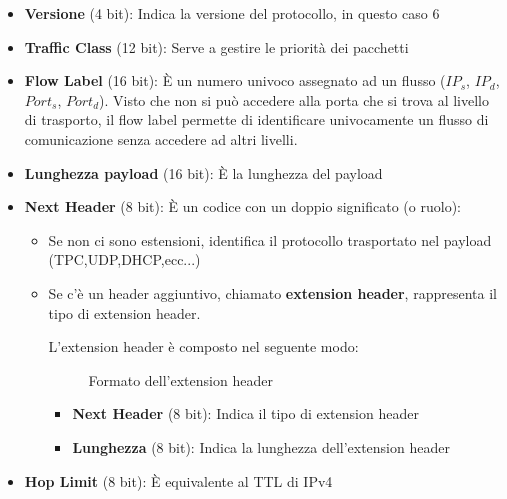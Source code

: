 \documentclass[a4paper]{article}
\begin{document}
\begin{itemize}
  \item \textbf{Versione} (4 bit): Indica la versione del protocollo, in questo caso 6
  \item \textbf{Traffic Class} (12 bit): Serve a gestire le priorità dei pacchetti
  \item \textbf{Flow Label} (16 bit): È un numero univoco assegnato ad un flusso 
    (\( IP_s \), \(IP_d\), \(Port_s\), \(Port_d \)). Visto che non si può accedere alla porta che si
    trova al livello di trasporto, il flow label permette di identificare univocamente
    un flusso di comunicazione senza accedere ad altri livelli.
  \item \textbf{Lunghezza payload} (16 bit): È la lunghezza del payload
  \item \textbf{Next Header} (8 bit): È un codice con un doppio significato (o ruolo):
    \begin{itemize}
      \item Se non ci sono estensioni, identifica il protocollo trasportato nel payload
        (TPC,UDP,DHCP,ecc...)
      \item Se c'è un header aggiuntivo, chiamato \textbf{extension header}, rappresenta
        il tipo di extension header.

        \noindent
        L'extension header è composto nel seguente modo:
        \begin{figure}[H]
          \centering
          \caption{Formato dell'extension header}
        \end{figure}
        \begin{itemize}
          \item \textbf{Next Header} (8 bit): Indica il tipo di extension header
          \item \textbf{Lunghezza} (8 bit): Indica la lunghezza dell'extension header
        \end{itemize}
    \end{itemize}
  \item \textbf{Hop Limit} (8 bit): È equivalente al TTL di IPv4
\end{itemize}
\end{document}
